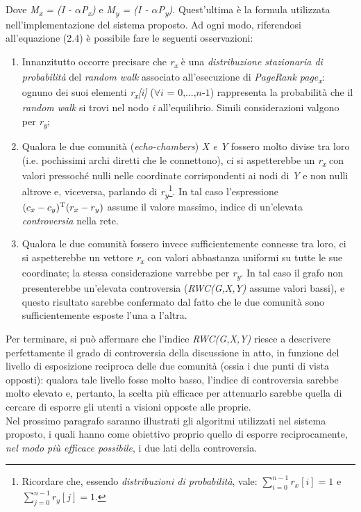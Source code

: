 \begin{enumerate}
\begin{equation}
\end{equation}
\\
Dove \textit{M\textsubscript{x} = (I - $\alpha$P\textsubscript{x})} e \textit{M\textsubscript{y} = (I - $\alpha$P\textsubscript{y})}. Quest'ultima è la formula utilizzata nell'implementazione del sistema proposto. Ad ogni modo, riferendosi all'equazione (2.4) è possibile fare le seguenti osservazioni:
\begin{enumerate}
\item Innanzitutto occorre precisare che \textit{r\textsubscript{x}} è una \textit{distribuzione stazionaria di probabilità} del \textit{random walk} associato all'esecuzione di \textit{PageRank page\textsubscript{x}}: ognuno dei suoi elementi \textit{r\textsubscript{x}[i]} ($\forall \textit{i = 0,...,n-1}$) rappresenta la probabilità che il \textit{random walk} si trovi nel nodo \textit{i} all'equilibrio. Simili considerazioni valgono per \textit{r\textsubscript{y}};
\item Qualora le due comunità (\textit{echo-chambers}) \textit{X e Y} fossero molto divise tra loro (i.e. pochissimi archi diretti che le connettono), ci si aspetterebbe un \textit{r\textsubscript{x}} con valori pressoché nulli nelle coordinate corrispondenti ai nodi di \textit{Y} e non nulli altrove e, viceversa, parlando di \textit{r\textsubscript{y}}\footnote{Ricordare che, essendo \textit{distribuzioni di probabilità}, vale: $\sum_{i=0}^{n-1} r_x[i] = 1$ e $\sum_{j=0}^{n-1} r_y[j] = 1$.}. In tal caso l'espressione $(c_x - c_y)\textsuperscript{T}(r_x - r_y)$ assume il valore massimo, indice di un'elevata \textit{controversia} nella rete.
\item Qualora le due comunità fossero invece sufficientemente connesse tra loro, ci si aspetterebbe un vettore \textit{r\textsubscript{x}} con valori abbastanza uniformi su tutte le sue coordinate; la stessa considerazione varrebbe per \textit{r\textsubscript{y}}. In tal caso il grafo non presenterebbe un'elevata controversia (\textit{RWC(G,X,Y)} assume valori bassi), e questo risultato sarebbe confermato dal fatto che le due comunità sono sufficientemente esposte l'una a l'altra.
\end{enumerate}
\end{enumerate}
Per terminare, si può affermare che l'indice \textit{RWC(G,X,Y)} riesce a descrivere perfettamente il grado di controversia della discussione in atto, in funzione del livello di esposizione reciproca delle due comunità (ossia i due punti di vista opposti): qualora tale livello fosse molto basso, l'indice di controversia sarebbe molto elevato e, pertanto, la scelta più efficace per attenuarlo sarebbe quella di cercare di esporre gli utenti a visioni opposte alle proprie. 
\\Nel prossimo paragrafo saranno illustrati gli algoritmi utilizzati nel sistema proposto, i quali hanno come obiettivo proprio quello di esporre reciprocamente, \textit{nel modo più efficace possibile}, i due lati della controversia. 


